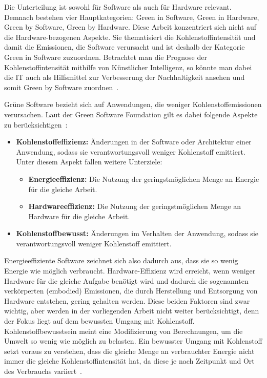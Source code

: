 Die Unterteilung ist sowohl für Software als auch für Hardware relevant.
Demnach bestehen vier Hauptkategorien:
Green in Software, Green in Hardware, Green by Software, Green by Hardware.
Diese Arbeit konzentriert sich nicht auf die Hardware-bezogenen Aspekte.
Sie thematisiert die Kohlenstoffintensität und damit die Emissionen, die Software verursacht und ist deshalb der Kategorie Green in Software zuzuordnen.
Betrachtet man die Prognose der Kohlenstoffintensität mithilfe von Künstlicher Intelligenz, so könnte man dabei die \ac{IT} auch als Hilfsmittel zur Verbesserung der Nachhaltigkeit ansehen und somit Green by Software zuordnen~\cite{Calero.2015}.

Grüne Software bezieht sich auf Anwendungen, die weniger Kohlenstoffemissionen verursachen.
Laut der Green Software Foundation gilt es dabei folgende Aspekte zu berücksichtigen~\cite{GreenSoftwareFoundation.20240316T16:54:58.000Z}:

\begin{itemize}
 \item \textbf{Kohlenstoffeffizienz:}
 Änderungen in der Software oder Architektur einer Anwendung, sodass sie verantwortungsvoll weniger Kohlenstoff emittiert. Unter diesem Aspekt fallen weitere Unterziele:
 \begin{itemize}
  \item \textbf{Energieeffizienz:}
  Die Nutzung der geringstmöglichen Menge an Energie für die gleiche Arbeit.
  \item \textbf{Hardwareeffizienz:}
  Die Nutzung der geringstmöglichen Menge an Hardware für die gleiche Arbeit.
 \end{itemize}
 \item \textbf{Kohlenstoffbewusst:}
 Änderungen im Verhalten der Anwendung, sodass sie verantwortungsvoll weniger Kohlenstoff emittiert.
\end{itemize}

\noindent Energieeffiziente Software zeichnet sich also dadurch aus, dass sie so wenig Energie wie möglich verbraucht.
Hardware-Effizienz wird erreicht, wenn weniger Hardware für die gleiche Aufgabe benötigt wird und dadurch die sogenannten verkörperten (embodied) Emissionen, die durch Herstellung und Entsorgung von Hardware entstehen, gering gehalten werden.
Diese beiden Faktoren sind zwar wichtig, aber werden in der vorliegenden Arbeit nicht weiter berücksichtigt, denn der Fokus liegt auf dem bewussten Umgang mit Kohlenstoff.
Kohlenstoffbewusstsein meint eine Modifizierung von Berechnungen, um die Umwelt so wenig wie möglich zu belasten.
Ein bewusster Umgang mit Kohlenstoff setzt voraus zu verstehen, dass die gleiche Menge an verbrauchter Energie nicht immer die gleiche Kohlenstoffintensität hat, da diese je nach Zeitpunkt und Ort des Verbrauchs variiert~\cite{GreenSoftwareFoundation.2022}.

